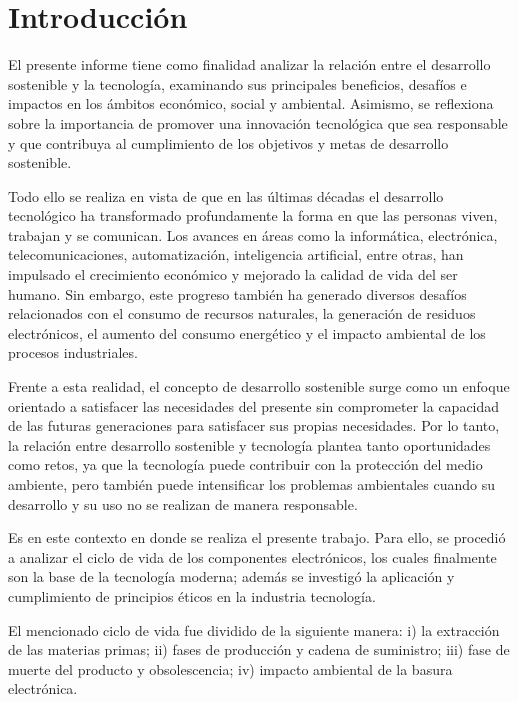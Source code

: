 \documentclass[stu,12pt,a4paper]{apa7}
\begin{document}
\clearpage
\setcounter{page}{2}

\tableofcontents
\newpage
\setlength{\parskip}{0.25cm} %
    \section{Introducción}
    El presente informe tiene como finalidad analizar la relación entre el desarrollo sostenible y la tecnología, examinando sus principales beneficios, desafíos e impactos en los ámbitos económico, social y ambiental. Asimismo, se reflexiona sobre la importancia de promover una innovación tecnológica que sea responsable y que contribuya al cumplimiento de los objetivos y metas de desarrollo sostenible.

Todo ello se realiza en vista de que en las últimas décadas el desarrollo tecnológico ha transformado profundamente la forma en que las personas viven, trabajan y se comunican. Los avances en áreas como la informática, electrónica, telecomunicaciones, automatización, inteligencia artificial, entre otras, han impulsado el crecimiento económico y mejorado la calidad de vida del ser humano. Sin embargo, este progreso también ha generado diversos desafíos relacionados con el consumo de recursos naturales, la generación de residuos electrónicos, el aumento del consumo energético y el impacto ambiental de los procesos industriales.

Frente a esta realidad, el concepto de desarrollo sostenible surge como un enfoque orientado a satisfacer las necesidades del presente sin comprometer la capacidad de las futuras generaciones para satisfacer sus propias necesidades. Por lo tanto, la relación entre desarrollo sostenible y tecnología plantea tanto oportunidades como retos, ya que la tecnología puede contribuir con la protección del medio ambiente, pero también puede intensificar los problemas ambientales cuando su desarrollo y su uso no se realizan de manera responsable.

Es en este contexto en donde se realiza el presente trabajo. Para ello, se procedió a analizar el ciclo de vida de los componentes electrónicos, los cuales finalmente son la base de la tecnología moderna; además se investigó la aplicación y cumplimiento de principios éticos en la industria tecnología. 

El mencionado ciclo de vida fue dividido de la siguiente manera: i) la extracción de las materias primas; ii) fases de producción y cadena de suministro; iii) fase de muerte del producto y obsolescencia; iv) impacto ambiental de la basura electrónica.
\end{document}
